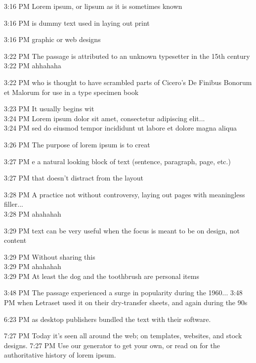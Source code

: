 \documentclass{article}
\begin{document}
\begin{chat}
3:16 PM Lorem ipsum, or lipsum as it is sometimes known

3:16 PM is dummy text used in laying out print

3:16 PM graphic or web designs

3:22 PM The passage is attributed to an unknown typesetter in the 15th century\\
3:22 PM ahhahaha

3:22 PM who is thought to have scrambled parts of Cicero's De Finibus Bonorum et Malorum for use in a type specimen book

3:23 PM It usually begins wit\\
3:24 PM Lorem ipsum dolor sit amet, consectetur adipiscing elit...\\
3:24 PM sed do eiusmod tempor incididunt ut labore et dolore magna aliqua

3:26 PM The purpose of lorem ipsum is to creat

3:27 PM e a natural looking block of text (sentence, paragraph, page, etc.)

3:27 PM that doesn't distract from the layout

3:28 PM A practice not without controversy, laying out pages with meaningless filler...\\
3:28 PM ahahahah

3:29 PM text can be very useful when the focus is meant to be on design, not content

3:29 PM Without sharing this \\
3:29 PM ahahahah\\
3:29 PM At least the dog and the toothbrush are personal items

3:48 PM The passage experienced a surge in popularity during the 1960...
3:48 PM when Letraset used it on their dry-transfer sheets, and again during the 90s

6:23 PM as desktop publishers bundled the text with their software.

7:27 PM Today it's seen all around the web; on templates, websites, and stock designs.
7:27 PM Use our generator to get your own, or read on for the authoritative history of lorem ipsum. 

\end{chat}
\end{document}
